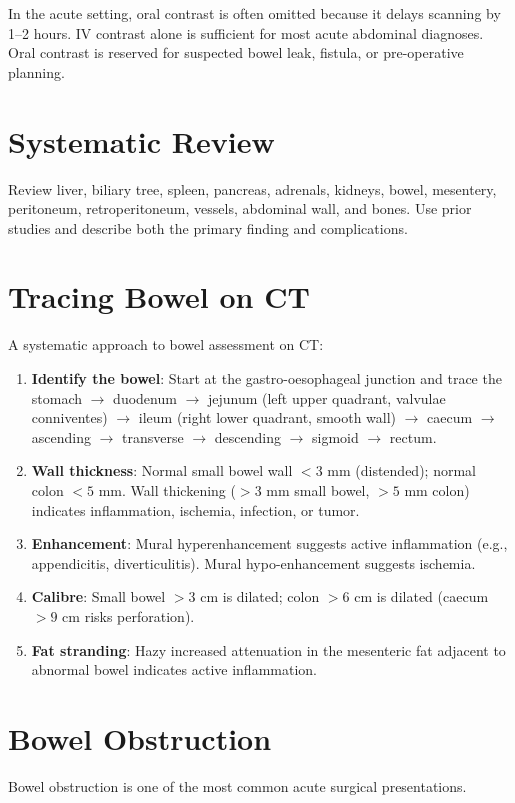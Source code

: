 \begin{pearlbox}
In the acute setting, oral contrast is often omitted because it delays scanning by 1--2 hours. IV contrast alone is sufficient for most acute abdominal diagnoses. Oral contrast is reserved for suspected bowel leak, fistula, or pre-operative planning.
\end{pearlbox}


\section{Systematic Review}
Review liver, biliary tree, spleen, pancreas, adrenals, kidneys, bowel, mesentery, peritoneum, retroperitoneum, vessels, abdominal wall, and bones. Use prior studies and describe both the primary finding and complications.


\section{Tracing Bowel on CT}
A systematic approach to bowel assessment on CT:

\begin{enumerate}
  \item \textbf{Identify the bowel}: Start at the gastro-oesophageal junction and trace the stomach $\rightarrow$ duodenum $\rightarrow$ jejunum (left upper quadrant, valvulae conniventes) $\rightarrow$ ileum (right lower quadrant, smooth wall) $\rightarrow$ caecum $\rightarrow$ ascending $\rightarrow$ transverse $\rightarrow$ descending $\rightarrow$ sigmoid $\rightarrow$ rectum.
  \item \textbf{Wall thickness}: Normal small bowel wall $< 3$ mm (distended); normal colon $< 5$ mm. Wall thickening ($> 3$ mm small bowel, $> 5$ mm colon) indicates inflammation, ischemia, infection, or tumor.
  \item \textbf{Enhancement}: Mural hyperenhancement suggests active inflammation (e.g., appendicitis, diverticulitis). Mural hypo-enhancement suggests ischemia.
  \item \textbf{Calibre}: Small bowel $> 3$ cm is dilated; colon $> 6$ cm is dilated (caecum $> 9$ cm risks perforation).
  \item \textbf{Fat stranding}: Hazy increased attenuation in the mesenteric fat adjacent to abnormal bowel indicates active inflammation.
\end{enumerate}


\section{Bowel Obstruction}
Bowel obstruction is one of the most common acute surgical presentations.

